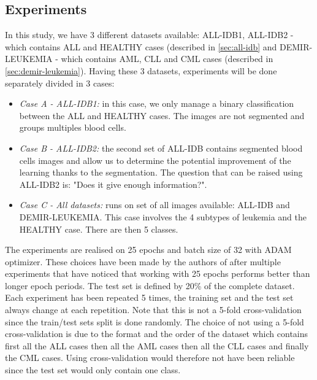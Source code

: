 \documentclass[11pt, openany]{report}
\theoremstyle{plain}
\theoremstyle{definition}
\theoremstyle{remark}
\begin{document}
\subsection{Experiments}

In this study, we have 3 different datasets available: ALL-IDB1, ALL-IDB2 - which contains ALL and HEALTHY cases (described in \autoref{sec:all-idb} and DEMIR-LEUKEMIA - which contains AML, CLL and CML cases (described in \autoref{sec:demir-leukemia}). Having these 3 datasets, experiments will be done separately divided in 3 cases: 

\begin{itemize}
\item \textit{Case A - ALL-IDB1:} in this case, we only manage a binary classification between the ALL and HEALTHY cases. The images are not segmented and groups multiples blood cells. 

\item \textit{Case B - ALL-IDB2:} the second set of ALL-IDB contains segmented blood cells images and allow us to determine the potential improvement of the learning thanks to the segmentation. The question that can be raised using ALL-IDB2 is: "Does it give enough information?". 

\item \textit{Case C - All datasets:} runs on set of all images available: ALL-IDB and DEMIR-LEUKEMIA. This case involves the 4 subtypes of leukemia and the HEALTHY case. There are then 5 classes. 
\end{itemize}   


The experiments are realised on 25 epochs and batch size of 32 with ADAM optimizer. These choices have been made by the authors of \cite{leukemia} after multiple experiments that have noticed that working with 25 epochs performs better than longer epoch periods. The test set is defined by 20\% of the complete dataset. Each experiment has been repeated 5 times, the training set and the test set always change at each repetition. Note that this is not a 5-fold cross-validation since the train/test sets split is done randomly. The choice of not using a 5-fold cross-validation is due to the format and the order of the dataset which contains first all the ALL cases then all the AML cases then all the CLL cases and finally the CML cases. Using cross-validation would therefore not have been reliable since the test set would only contain one class. 
\end{document}

